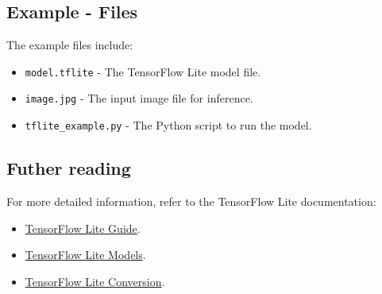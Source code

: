 {
	\label{ExampleCode_TensorFlow.ino}
}




\subsection{Example - Files}

The example files include:

\begin{itemize}
	\item \texttt{model.tflite} - The TensorFlow Lite model file.
	\item \texttt{image.jpg} - The input image file for inference.
	\item \texttt{tflite\_example.py} - The Python script to run the model.
\end{itemize}

\subsection{Futher reading}
For more detailed information, refer to the TensorFlow Lite documentation:
\begin{itemize}
	\item \href{https://www.tensorflow.org/lite/guide}{TensorFlow Lite Guide}.
	\item \href{https://www.tensorflow.org/lite/models}{TensorFlow Lite Models}.
	\item \href{https://www.tensorflow.org/lite/convert}{TensorFlow Lite Conversion}.
	
\end{itemize}


